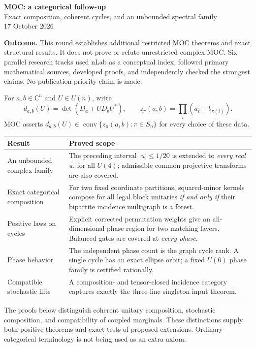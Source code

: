 \documentclass[11pt]{article}
\newcommand{\C}{\mathbb C}\newcommand{\R}{\mathbb R}\newcommand{\conv}{\operatorname{conv}}
\begin{document}
\begin{center}
{\LARGE\bfseries\color{ink} MOC: a categorical follow-up}\\[7pt]
{\large Exact composition, coherent cycles, and an unbounded spectral family}\\[7pt]
17 October 2026
\end{center}

\textbf{Outcome.} This round establishes additional restricted MOC theorems and exact structural results. It does not prove or refute unrestricted complex MOC. Six parallel research tracks used nLab as a conceptual index, followed primary mathematical sources, developed proofs, and independently checked the strongest claims. No publication-priority claim is made.

For $a,b\in\C^n$ and $U\in U(n)$, write
\[
d_{a,b}(U)=\det(D_a+UD_bU^*),\qquad
z_\pi(a,b)=\prod_i(a_i+b_{\pi(i)}).
\]
MOC asserts $d_{a,b}(U)\in\conv\{z_\pi(a,b):\pi\in S_n\}$ for every choice of these data.

\begin{center}\begin{tabular}{p{}p{}}
\toprule Result & Proved scope\\\midrule
An unbounded complex family & The preceding interval $|u|\le1/20$ is extended to \emph{every real $u$}, for all $U(4)$; admissible common projective transforms are also covered.\\
Exact categorical composition & For two fixed coordinate partitions, squared-minor kernels compose for all legal block unitaries \emph{if and only if} their bipartite incidence multigraph is a forest.\\
Positive laws on cycles & Explicit corrected permutation weights give an all-dimensional phase region for two matching layers. Balanced gates are covered at \emph{every phase}.\\
Phase behavior & The independent phase count is the graph cycle rank. A single cycle has an exact ellipse orbit; a fixed $U(6)$ phase family is certified rationally.\\
Compatible stochastic lifts & A composition- and tensor-closed incidence category captures exactly the three-line singleton input theorem.\\\bottomrule
\end{tabular}\end{center}

The proofs below distinguish coherent unitary composition, stochastic composition, and compatibility of coupled marginals. These distinctions supply both positive theorems and exact tests of proposed extensions. Ordinary categorical terminology is not being used as an extra axiom.
\end{document}
